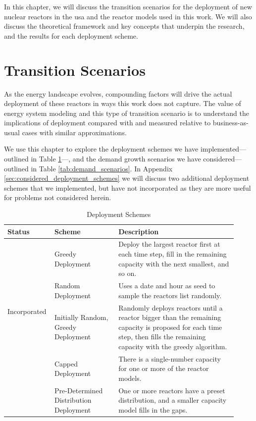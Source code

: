 In this chapter, we will discuss the transition scenarios for the deployment of new nuclear reactors in the \gls{usa} and the reactor models used in this work. We will also discuss the theoretical framework and key concepts that underpin the research, and the results for each deployment scheme.

\section{Transition Scenarios}
\label{sec:transition_scenarios}

As the energy landscape evolves, compounding
factors will drive the actual deployment of these reactors in ways this work
does not capture. The value of energy system modeling and this type of
transition scenario is to understand the implications of deployment compared
with and measured relative to business-as-usual cases with similar
approximations.

We use this chapter to explore the deployment schemes we have
implemented---outlined in Table \ref{tab:deployment_schemes}---, and the demand
growth scenarios we have considered---outlined in Table
\ref{tab:demand_scenarios}. In Appendix \ref{sec:considered_deployment_schemes}
we will discuss two additional deployment schemes that we implemented, but
have not incorporated as they are more useful for problems not considered herein.

\begin{table}[H]
    \centering
    \caption{Deployment Schemes}
    \label{tab:deployment_schemes}
    \begin{tabular}{p{0.15\linewidth} p{0.27\linewidth} p{0.50\linewidth}}
        \hline
        Status & Scheme & Description \\
        \hline
        \multirow{4}{*}{Incorporated} & Greedy Deployment & Deploy the largest
        reactor first at each time step, fill in the remaining capacity with
        the next smallest, and so on. \\
        & Random Deployment & Uses a date and hour as seed to sample the
        reactors list randomly. \\
        & Initially Random, Greedy Deployment & Randomly deploys reactors until
        a reactor bigger than the remaining capacity is proposed for each time step,
        then fills the remaining capacity with the greedy algorithm. \\
        \hline
        \multirow{2}{*}{Not Incorporated} & Capped Deployment & There is a
        single-number capacity for one or more of the reactor models. \\
        & Pre-Determined Distribution Deployment & One or more reactors have a
        preset distribution, and a smaller capacity model fills in the gaps. \\
        \hline
    \end{tabular}
\end{table}

